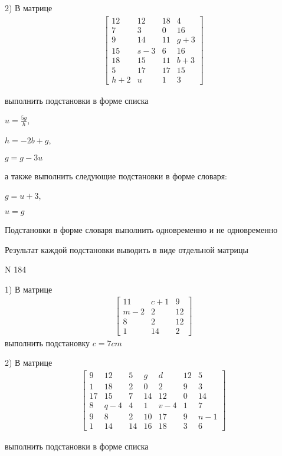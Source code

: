 \documentclass[11pt]{report}
\begin{document}
    2) В матрице
\begin{align*}
\left[\begin{matrix}12 & 12 & 18 & 4\\7 & 3 & 0 & 16\\9 & 14 & 11 & g + 3\\15 & s - 3 & 6 & 16\\18 & 15 & 11 & b + 3\\5 & 17 & 17 & 15\\h + 2 & u & 1 & 3\end{matrix}\right]
\end{align*}

выполнить подстановки в форме списка

$u=\frac{5 g}{h}$,

$h=- 2 b + g$,

$g=g - 3 u$

а также выполнить следующие подстановки в форме словаря:

$g=u + 3$,

$u=g$


    Подстановки в форме словаря выполнить одновременно и не одновременно


    Результат каждой подстановки выводить в виде отдельной матрицы

\newpage
N 184


    1) В матрице
\begin{align*}
\left[\begin{matrix}11 & c + 1 & 9\\m - 2 & 2 & 12\\8 & 2 & 12\\1 & 14 & 2\end{matrix}\right]
\end{align*}
выполнить подстановку $c=7 c m$


    2) В матрице
\begin{align*}
\left[\begin{matrix}9 & 12 & 5 & g & d & 12 & 5\\1 & 18 & 2 & 0 & 2 & 9 & 3\\17 & 15 & 7 & 14 & 12 & 0 & 14\\8 & q - 4 & 4 & 1 & v - 4 & 1 & 7\\9 & 8 & 2 & 10 & 17 & 9 & n - 1\\1 & 14 & 14 & 16 & 18 & 3 & 6\end{matrix}\right]
\end{align*}

выполнить подстановки в форме списка
\end{document}
